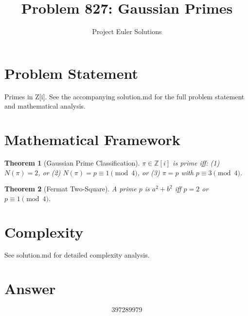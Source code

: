 \documentclass[11pt]{article}
\title{Problem 827: Gaussian Primes}
\author{Project Euler Solutions}
\date{}
\newtheorem{theorem}{Theorem}
\begin{document}
\maketitle

\section{Problem Statement}

Primes in Z[i]. See the accompanying solution.md for the full problem statement and mathematical analysis.

\section{Mathematical Framework}

\begin{theorem}[Gaussian Prime Classification]
$\pi \in \mathbb{Z}[i]$ is prime iff: (1) $N(\pi) = 2$, or (2) $N(\pi) = p \equiv 1 \pmod{4}$, or (3) $\pi = p$ with $p \equiv 3 \pmod{4}$.
\end{theorem}

\begin{theorem}[Fermat Two-Square]
A prime $p$ is $a^2+b^2$ iff $p = 2$ or $p \equiv 1 \pmod{4}$.
\end{theorem}

\section{Complexity}

See solution.md for detailed complexity analysis.

\section{Answer}

\[
\boxed{397289979}
\]
\end{document}
